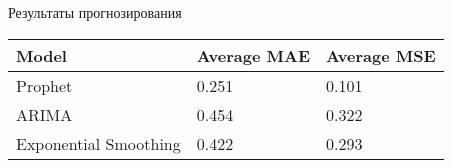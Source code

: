 \documentclass{beamer}
\begin{document}
\begin{frame}{Результаты прогнозирования}

\begin{table}[h]
\centering
\begin{tabular}{|l|l|l|}
\hline
\textbf{Model} & \textbf{Average MAE} & \textbf{Average MSE} \\ \hline
Prophet         & 0.251               & 0.101               \\ \hline
ARIMA           & 0.454               & 0.322               \\ \hline
Exponential Smoothing & 0.422         & 0.293               \\ \hline
\end{tabular}
\label{tab:ModelComparison}
\end{table}




\end{frame}
\end{document}

